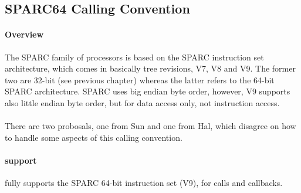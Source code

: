 %
%
%
%

\subsection{SPARC64 Calling Convention}

\paragraph{Overview}

The SPARC family of processors is based on the SPARC instruction set architecture, which comes in basically tree revisions,
V7, V8\cite{SPARCV8}\cite{SPARCSysV} and V9\cite{SPARCV9}\cite{SPARCV9SysV}. The former two are 32-bit (see previous chapter) whereas the latter refers to the 64-bit SPARC architecture.
SPARC uses big endian byte order, however, V9 supports also little endian byte order, but for data access only, not instruction access.\\
\\
There are two probosals, one from Sun and one from Hal, which disagree on how to handle some aspects of this calling convention.\\

\paragraph{ support}

 fully supports the SPARC 64-bit instruction set (V9), for calls and callbacks.

